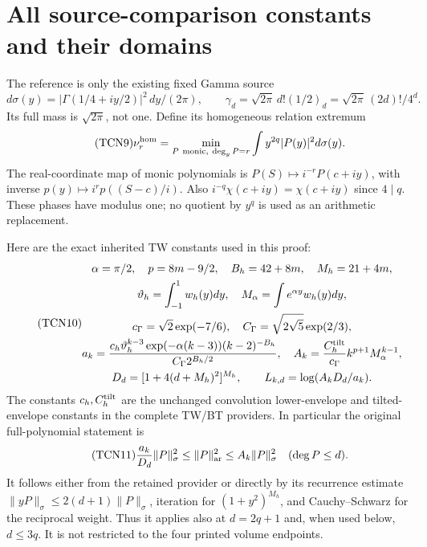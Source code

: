 \documentclass[11pt,a4paper]{article}
\begin{document}
\section{All source-comparison constants and their domains}

The reference is only the existing fixed Gamma source
\[
 d\sigma(y)=|\Gamma(1/4+iy/2)|^2\,dy/(2\pi),\qquad
 \gamma_d=\sqrt{2\pi}\,d!(1/2)_d=\sqrt{2\pi}\,(2d)!/4^d.
\]
Its full mass is $\sqrt{2\pi}$, not one. Define its homogeneous
relation extremum
\begin{equation}\tag{TCN9}
 \nu_r^{\rm hom}=\min_{P\ \mathrm{monic},\ \deg_yP=r}
                     \int y^{2q}|P(y)|^2d\sigma(y).
\end{equation}
The real-coordinate map of monic polynomials is
$P(S)\mapsto i^{-r}P(c+iy)$, with inverse
$p(y)\mapsto i^rp((S-c)/i)$. Also $i^{-q}\chi(c+iy)=\chi(c+iy)$
since $4\mid q$. These phases have modulus one; no quotient by $y^q$
is used as an arithmetic replacement.

Here are the exact inherited TW constants used in this proof:
\begin{equation}\tag{TCN10}
 \begin{gathered}
 \alpha=\pi/2,\quad p=8m-9/2,\quad B_h=42+8m,\quad M_h=21+4m,\\
 \vartheta_h=\int_{-1}^1w_h(y)dy,
 \quad M_\alpha=\int e^{\alpha y}w_h(y)dy,\\
 c_\Gamma=\sqrt2\exp(-7/6),\quad
 C_\Gamma=\sqrt{2\sqrt5}\exp(2/3),\\
 a_k=\frac{c_h\vartheta_h^{k-3}\exp(-\alpha(k-3))(k-2)^{-B_h}}
                   {C_\Gamma2^{B_h/2}},\quad
 A_k=\frac{C_h^{\rm tilt}}{c_\Gamma}k^{p+1}M_\alpha^{k-1},\\
 D_d=[1+4(d+M_h)^2]^{M_h},\qquad L_{k,d}=\log(A_kD_d/a_k).
 \end{gathered}
\end{equation}
The constants $c_h,C_h^{\rm tilt}$ are the unchanged convolution
lower-envelope and tilted-envelope constants in the complete TW/BT
providers. In particular the original full-polynomial statement is
\begin{equation}\tag{TCN11}
 \frac{a_k}{D_d}\|P\|_\sigma^2\le\|P\|_{\mathrm{ar}}^2
       \le A_k\|P\|_\sigma^2\quad(\deg P\le d).
\end{equation}
It follows either from the retained provider or directly by its
recurrence estimate $\|yP\|_\sigma\le2(d+1)\|P\|_\sigma$,
iteration for $(1+y^2)^{M_h}$, and Cauchy--Schwarz for the reciprocal
weight. Thus it applies also at $d=2q+1$ and, when used below, $d\le3q$.
It is not restricted to the four printed volume endpoints.
\end{document}
